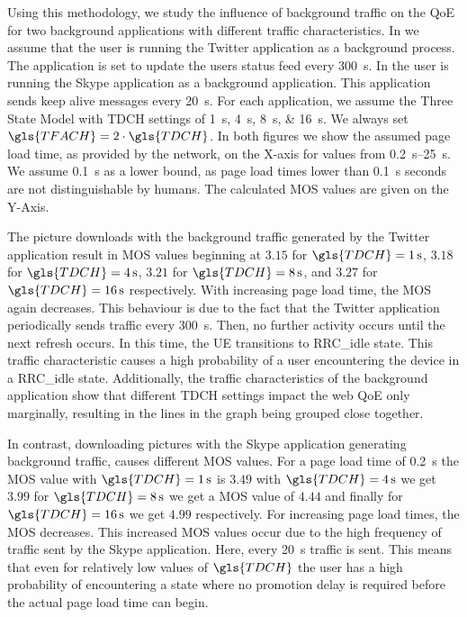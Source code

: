 Using this methodology, we study the influence of background traffic on the \gls{QoE} for two background applications with different traffic characteristics.
In  we assume that the user is running the Twitter application as a background process.
The application is set to update the users status feed every \SI{300}{\second}.
In  the user is running the Skype application as a background application.
This application sends keep alive messages every \SI{20}{\second}.
For each application, we assume the Three State Model with \gls{TDCH} settings of \SIlist{1;4;8;16}{\second}.
We always set \(\gls{TFACH} = 2\cdot \gls{TDCH}\).
In both figures we show the assumed page load time, as provided by the network, on the X-axis for values from \SIrange{0.2}{25}{\second}.
We assume \SI{0.1}{\second} as a lower bound, as page load times lower than \SI{0.1}{\second} seconds are not distinguishable \cite{egger2012b} by humans.
The calculated \gls{MOS} values are given on the Y-Axis.

The picture downloads with the background traffic generated by the Twitter application result in \gls{MOS} values beginning at \(3.15\) for \(\gls{TDCH} = \SI{1}{\second}\), \(3.18\) for \(\gls{TDCH} = \SI{4}{\second}\), \(3.21\) for \(\gls{TDCH} = \SI{8}{\second}\), and \(3.27\) for \(\gls{TDCH} = \SI{16}{\second}\) respectively.
With increasing page load time, the \gls{MOS} again decreases.
This behaviour is due to the fact that the Twitter application periodically sends traffic every \SI{300}{\second}.
Then, no further activity occurs until the next refresh occurs.
In this time, the \gls{UE} transitions to \gls{RRC_idle} state.
This traffic characteristic causes a high probability of a user encountering the device in a \gls{RRC_idle} state.
Additionally, the traffic characteristics of the background application show that different \gls{TDCH} settings impact the web \gls{QoE} only marginally, resulting in the lines in the graph being grouped close together.

In contrast, downloading pictures with the Skype application generating background traffic, causes different \gls{MOS} values.
For a page load time of \SI{0.2}{\second} the \gls{MOS} value with \(\gls{TDCH} = \SI{1}{\second}\) is \(3.49\) with \(\gls{TDCH} = \SI{4}{\second}\) we get \(3.99\) for \(\gls{TDCH} = \SI{8}{\second}\) we get a \gls{MOS} value of \(4.44\) and finally for \(\gls{TDCH} = \SI{16}{\second}\) we get \(4.99\) respectively.
For increasing page load times, the \gls{MOS} decreases.
This increased \gls{MOS} values occur due to the high frequency of traffic sent by the Skype application.
Here, every \SI{20}{\second} traffic is sent.
This means that even for relatively low values of \(\gls{TDCH}\) the user has a high probability of encountering a state where no promotion delay is required before the actual page load time can begin.

